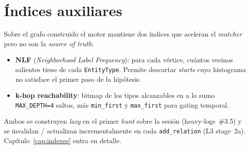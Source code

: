 \section{Índices auxiliares}

Sobre el grafo construido el motor mantiene dos índices que aceleran
el \emph{matcher} pero no son la \emph{source of truth}:

\begin{itemize}
    \item \textbf{NLF} (\emph{Neighborhood Label Frequency}): para
    cada vértice, cuántos vecinos salientes tiene de cada
    \texttt{EntityType}. Permite descartar \emph{starts} cuyo
    histograma no satisface el primer paso de la hipótesis.
    \item \textbf{k-hop reachability}: bitmap de los tipos
    alcanzables en a lo sumo \texttt{MAX\_DEPTH=4} saltos, más
    \texttt{min\_first} y \texttt{max\_first} para gating temporal.
\end{itemize}

Ambos se construyen \emph{lazy} en el primer \emph{hunt} sobre la
sesión (heavy-logs~\#3.5) y se invalidan / actualizan
incrementalmente en cada \texttt{add\_relation} (L3 stage~2a).
Capítulo~\ref{cap:indexes} entra en detalle.
